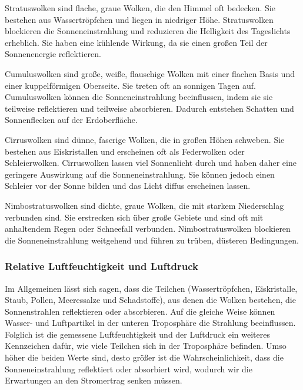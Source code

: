 \documentclass[12pt, a4paper]{article}
\begin{document}

Stratuswolken sind flache, graue Wolken, die den Himmel oft bedecken. Sie bestehen aus Wassertröpfchen und liegen in niedriger Höhe. Stratuswolken blockieren die Sonneneinstrahlung und reduzieren die Helligkeit des Tageslichts erheblich. Sie haben eine kühlende Wirkung, da sie einen großen Teil der Sonnenenergie reflektieren.

Cumuluswolken sind große, weiße, flauschige Wolken mit einer flachen Basis und einer kuppelförmigen Oberseite. Sie treten oft an sonnigen Tagen auf. Cumuluswolken können die Sonneneinstrahlung beeinflussen, indem sie sie teilweise reflektieren und teilweise absorbieren. Dadurch entstehen Schatten und Sonnenflecken auf der Erdoberfläche.

Cirruswolken sind dünne, faserige Wolken, die in großen Höhen schweben. Sie bestehen aus Eiskristallen und erscheinen oft als Federwolken oder Schleierwolken. Cirruswolken lassen viel Sonnenlicht durch und haben daher eine geringere Auswirkung auf die Sonneneinstrahlung. Sie können jedoch einen Schleier vor der Sonne bilden und das Licht diffus erscheinen lassen.

Nimbostratuswolken sind dichte, graue Wolken, die mit starkem Niederschlag verbunden sind. Sie erstrecken sich über große Gebiete und sind oft mit anhaltendem Regen oder Schneefall verbunden. Nimbostratuswolken blockieren die Sonneneinstrahlung weitgehend und führen zu trüben, düsteren Bedingungen.

\subsubsection{Relative Luftfeuchtigkeit und Luftdruck}

Im Allgemeinen lässt sich sagen, dass die Teilchen (Wassertröpfchen, Eiskristalle, Staub, Pollen, Meeressalze und Schadstoffe), aus denen die Wolken bestehen, die Sonnenstrahlen reflektieren oder absorbieren. Auf die gleiche Weise können Wasser- und Luftpartikel in der unteren Troposphäre die Strahlung beeinflussen. Folglich ist die gemessene Luftfeuchtigkeit und der Luftdruck ein weiteres Kennzeichen dafür, wie viele Teilchen sich in der Troposphäre befinden. Umso höher die beiden Werte sind, desto größer ist die Wahrscheinlichkeit, dass die Sonneneinstrahlung reflektiert oder absorbiert wird, wodurch wir die Erwartungen an den Stromertrag senken müssen. 
\end{document}

